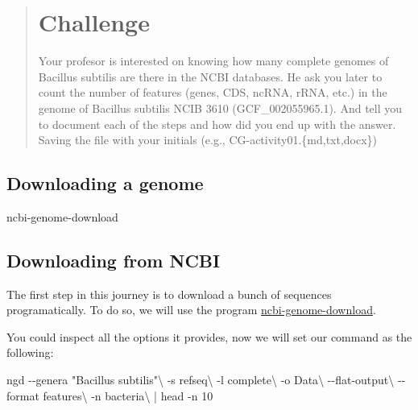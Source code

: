 \documentclass[
  letterpaper,
  DIV=11,
  numbers=noendperiod]{scrreprt}
\newenvironment{Shaded}{\begin{snugshade}}{\end{snugshade}}
\newcommand{\AttributeTok}[1]{\textcolor[rgb]{0.40,0.46,0.14}{#1}}
\newcommand{\DataTypeTok}[1]{\textcolor[rgb]{0.68,0.00,0.00}{#1}}
\newcommand{\ExtensionTok}[1]{\textcolor[rgb]{0.00,0.46,0.62}{#1}}
\newcommand{\FunctionTok}[1]{\textcolor[rgb]{0.28,0.35,0.67}{#1}}
\newcommand{\KeywordTok}[1]{\textcolor[rgb]{0.00,0.46,0.62}{#1}}
\newcommand{\NormalTok}[1]{\textcolor[rgb]{0.00,0.46,0.62}{#1}}
\newcommand{\StringTok}[1]{\textcolor[rgb]{0.13,0.47,0.30}{#1}}
\begin{document}
\begin{quote}
\hypertarget{challenge}{%
\section*{Challenge}\label{challenge}}

Your profesor is interested on knowing how many complete genomes of
Bacillus subtilis are there in the NCBI databases. He ask you later to
count the number of features (genes, CDS, ncRNA, rRNA, etc.) in the
genome of Bacillus subtilis NCIB 3610 (GCF\_002055965.1). And tell you
to document each of the steps and how did you end up with the answer.
Saving the file with your initials (e.g., CG-activity01.\{md,txt,docx\})
\end{quote}

\hypertarget{downloading-a-genome}{%
\subsection*{Downloading a genome}\label{downloading-a-genome}}

\begin{Shaded}
\begin{Highlighting}[]
\ExtensionTok{ncbi{-}genome{-}download}
\end{Highlighting}
\end{Shaded}

\hypertarget{downloading-from-ncbi}{%
\subsection*{Downloading from NCBI}\label{downloading-from-ncbi}}

The first step in this journey is to download a bunch of sequences
programatically. To do so, we will use the program
\href{https://github.com/kblin/ncbi-genome-download}{ncbi-genome-download}.

You could inspect all the options it provides, now we will set our
command as the following:

\begin{Shaded}
\begin{Highlighting}[]
\ExtensionTok{ngd} \AttributeTok{{-}{-}genera} \StringTok{"Bacillus subtilis"}\DataTypeTok{\textbackslash{}}
    \AttributeTok{{-}s}\NormalTok{ refseq}\DataTypeTok{\textbackslash{}}
    \AttributeTok{{-}l}\NormalTok{ complete}\DataTypeTok{\textbackslash{}}
    \AttributeTok{{-}o}\NormalTok{ Data}\DataTypeTok{\textbackslash{}}
    \AttributeTok{{-}{-}flat{-}output}\DataTypeTok{\textbackslash{}}
    \AttributeTok{{-}{-}format}\NormalTok{ features}\DataTypeTok{\textbackslash{}}
    \AttributeTok{{-}n}\NormalTok{ bacteria}\DataTypeTok{\textbackslash{}}
    \KeywordTok{|} \FunctionTok{head} \AttributeTok{{-}n}\NormalTok{ 10}
\end{Highlighting}
\end{Shaded}
\end{document}
